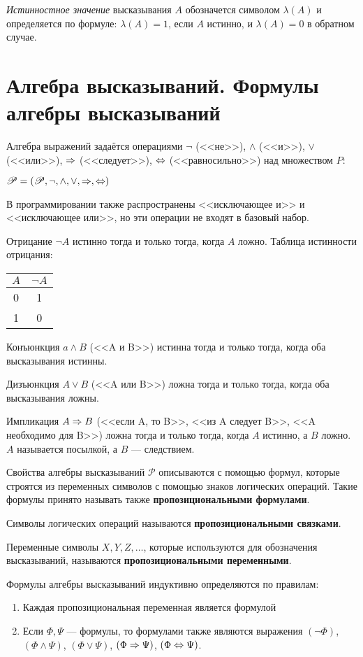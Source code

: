 \textit{Истинностное значение} высказывания $A$ обозначется символом $\lambda(A)$ и определяется по формуле:
$\lambda(A) = 1$, если $A$ истинно, и $\lambda(A) = 0$ в обратном случае.

\section{Алгебра высказываний. Формулы алгебры высказываний}
Алгебра выражений задаётся операциями $\lnot$ (<<не>>), $\land$ (<<и>>), $\lor$ (<<или>>), $\Rightarrow$ (<<следует>>), $\Leftrightarrow$ (<<равносильно>>) над множеством $P$:

$\mathscr{P} = (\mathscr{P}, \lnot, \land, \lor, \Rightarrow, \Leftrightarrow)$

В программировании также распространены <<исключающее и>> и <<исключающее или>>, но эти операции не входят в базовый набор.

Отрицание $\lnot A$ истинно тогда и только тогда, когда $A$ ложно. Таблица истинности отрицания:

\begin{tabular}{|c|c|}
    \hline
    $A$ & $\lnot A$ \\
    \hline
    0   &  1        \\
    \hline
    1   &  0        \\
    \hline
\end{tabular}

Конъюнкция $a \land B$ (<<A и B>>) истинна тогда и только тогда, когда оба высказывания истинны.

Дизъюнкция $A \lor B$ (<<A или B>>) ложна тогда и только тогда, когда оба высказывания ложны.

Импликация $A \Rightarrow B$ (<<если A, то B>>, <<из A следует B>>, <<A необходимо для B>>) ложна тогда и только тогда, когда $A$ истинно, а $B$ ложно. $A$ называется посылкой, а $B$ --- следствием.

\dftion Свойства алгебры высказываний $\mathscr{P}$ описываются с помощью формул, которые строятся из переменных символов с помощью знаков логических операций. Такие формулы принято называть также \textbf{пропозициональными формулами}.

\dftion Символы логических операций называются \textbf{пропозициональными связками}.

\dftion Переменные символы $X, Y, Z, \dots$, которые используются для обозначения высказываний, называются \textbf{пропозициональными переменными}.

\dftion Формулы алгебры высказываний индуктивно определяются по правилам:
\begin{enumerate}
    \item Каждая пропозициональная переменная является формулой
    \item Если $\Phi, \Psi$ --- формулы, то формулами также являются выражения $(\lnot \Phi)$, $(\Phi \land \Psi)$, $(\Phi \lor \Psi)$, $(\Phi \Rightarrow \Psi)$, $(\Phi \Leftrightarrow \Psi)$.
\end{enumerate}

